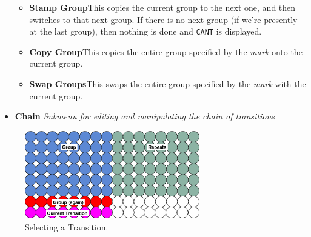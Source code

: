 \documentclass{article}
\begin{document}
\begin{itemize}
\begin{itemize}



\item {\bf Stamp Group}\quad This copies the current group to the next one, and then switches to that next group.  If there is no next group (if we're presently at the last group), then nothing is done and \texttt{CANT} is displayed.
\item {\bf Copy Group}\quad This copies the entire group specified by the {\it mark} onto the current group.
\item {\bf Swap Groups}\quad This swaps the entire group specified by the {\it mark} with the current group.
\end{itemize}

\item {\bf Chain} {\it Submenu for editing and manipulating the chain of transitions}
\end{itemize}

\begin{figure}
\vspace{-1em}\includegraphics[width=3in]{SelectTransition}
\vspace{-2em}\caption{\small Selecting a Transition.}
\label{selecttransition}
\end{figure}
\end{document}
